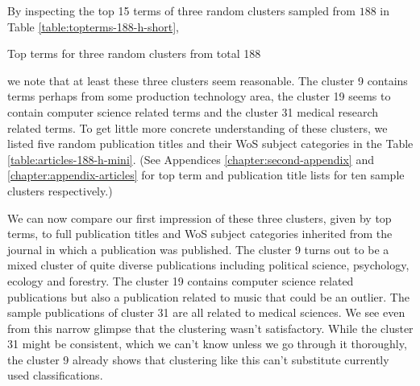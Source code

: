 By inspecting the top 15 terms of three random clusters sampled 
from $188$ in Table \ref{table:topterms-188-h-short},
\begin{table}[htp]
  \begin{center}
    
    \caption{Top terms for three random clusters from total 188}
    \label{table:topterms-188-h-short}    
 \end{center}
\end{table}
we note that at least these three clusters seem reasonable. The 
cluster 9 contains terms perhaps from some production technology
area, the cluster 19 seems to contain computer science related
terms and the cluster 31 medical research related terms.
To get little more concrete understanding of these clusters, we 
listed five random publication titles and their WoS subject 
categories in the Table \ref{table:articles-188-h-mini}. (See 
Appendices \ref{chapter:second-appendix} and 
\ref{chapter:appendix-articles} for top term and publication 
title lists for ten sample clusters respectively.)
\newpage

We can now compare our first impression of these three clusters, 
given by top terms, to full publication titles and WoS subject 
categories inherited from the journal in which a publication was
published. The cluster 9 turns out to be a mixed cluster of quite
diverse publications including political science, psychology, 
ecology and forestry. The cluster 19 contains computer science 
related publications but also a publication related to music that 
could be an outlier. The sample publications of cluster 31 are all
related to medical sciences. 
We see even from this narrow glimpse
that the clustering wasn't satisfactory.
While the cluster 31 might be consistent, which we can't know 
unless we go through it thoroughly, the cluster 9 already shows
that clustering like this can't substitute currently used 
classifications.



%

